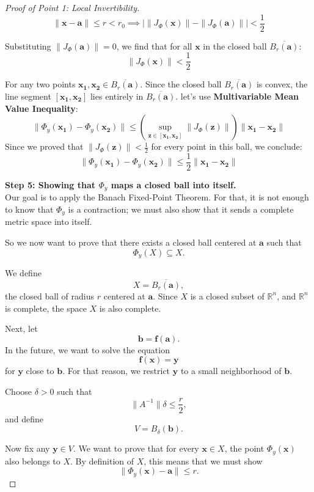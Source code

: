 \documentclass{article}
\begin{document}
\begin{proof}[Proof of Point 1: Local Invertibility]
$$\|\mathbf{x} - \mathbf{a}\| \le r < r_0 \implies |\|J_{\Phi}(\mathbf{x})\| - \|J_{\Phi}(\mathbf{a})\|| < \frac{1}{2}$$

Substituting $\|J_{\Phi}(\mathbf{a})\| = 0$, we find that for all $\mathbf{x}$ in the closed ball $\overline{B_r(\mathbf{a})}$:$$\|J_{\Phi}(\mathbf{x})\| < \frac{1}{2}$$

For any two points $\mathbf{x_1}, \mathbf{x_2} \in \overline{B_r(\mathbf{a})}$. Since the closed ball $\overline{B_r(\mathbf{a})}$ is convex, the line segment $[\mathbf{x_1}, \mathbf{x_2}]$ lies  entirely in $\overline{B_r(\mathbf{a})}$. let's use \textbf{Multivariable Mean Value Inequality}:$$\|\Phi_y(\mathbf{x_1}) - \Phi_y(\mathbf{x_2})\| \leq \left( \sup_{\mathbf{z} \in [\mathbf{x_1}, \mathbf{x_2}]} \|J_{\Phi}(\mathbf{z})\| \right) \|\mathbf{x_1} - \mathbf{x_2}\|$$Since we proved that $\|J_{\Phi}(\mathbf{z})\| < \frac{1}{2}$ for every point in this ball, we conclude:$$\|\Phi_y(\mathbf{x_1}) - \Phi_y(\mathbf{x_2})\| \leq \frac{1}{2} \|\mathbf{x_1} - \mathbf{x_2}\|$$

\textbf{Step 5: Showing that $\Phi_y$ maps a closed ball into itself.} \\

Our goal is to apply the Banach Fixed-Point Theorem. For that, it is not enough to know that $\Phi_y$ is a contraction; we must also show that it sends a complete metric space into itself.

So we now want to prove that there exists a closed ball centered at $\mathbf{a}$ such that
\[
\Phi_y(X)\subseteq X.
\]

We define
\[
X=\overline{B_r(\mathbf{a})},
\]
the closed ball of radius $r$ centered at $\mathbf{a}$. Since $X$ is a closed subset of $\mathbb{R}^n$, and $\mathbb{R}^n$ is complete, the space $X$ is also complete.

Next, let
\[
\mathbf{b}=\mathbf{f}(\mathbf{a}).
\]
In the future, we want to solve the equation
\[
\mathbf{f}(\mathbf{x})=\mathbf{y}
\]
for $\mathbf{y}$ close to $\mathbf{b}$. For that reason, we restrict $\mathbf{y}$ to a small neighborhood of $\mathbf{b}$.

Choose $\delta>0$ such that
\[
\|A^{-1}\|\delta \le \frac r2,
\]
and define
\[
V=B_\delta(\mathbf{b}).
\]

Now fix any $\mathbf{y}\in V$. We want to prove that for every $\mathbf{x}\in X$, the point $\Phi_y(\mathbf{x})$ also belongs to $X$. By definition of $X$, this means that we must show
\[
\|\Phi_y(\mathbf{x})-\mathbf{a}\|\le r.
\]


\end{proof}
\end{document}
